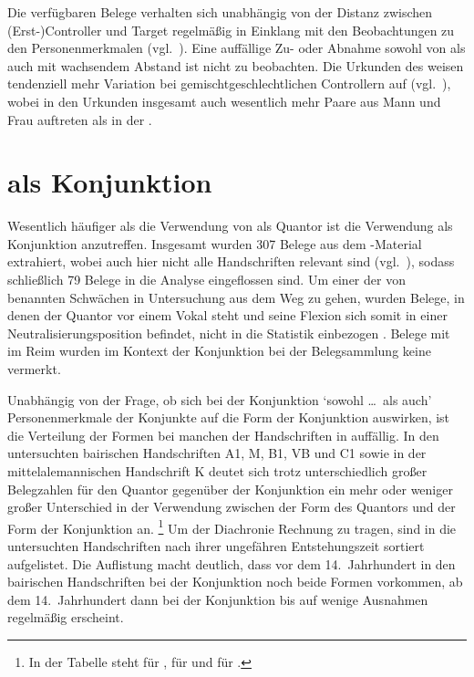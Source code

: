 Die verfügbaren Belege verhalten sich unabhängig von der Distanz zwischen
(Erst-)Controller und Target regelmäßig in Einklang mit den Beobachtungen zu den
Personenmerkmalen (vgl.~). Eine auffällige Zu-
oder Abnahme sowohl von  als auch  mit wachsendem
Abstand ist nicht zu beobachten. Die Urkunden des \CAO{}
weisen tendenziell mehr Variation bei gemischtgeschlechtlichen Controllern auf
(vgl.\ ), wobei in den Urkunden insgesamt auch wesentlich
mehr Paare aus Mann und Frau auftreten als in der \KC{}.


\section{ als Konjunktion}
\label{sec:kckonjunktion}

Wesentlich häufiger als die Verwendung von  als Quantor ist die
Verwendung als Konjunktion anzutreffen. Insgesamt wurden 307 Belege aus dem
\KC{}-Material extrahiert, wobei auch hier nicht alle Handschriften
relevant sind (vgl.\ ), sodass schließlich 79 Belege in
die Analyse eingeflossen sind. Um einer der von \citet{gjelsten1980} benannten
Schwächen in  Untersuchung aus dem Weg zu gehen, wurden
Belege, in denen der Quantor vor einem Vokal steht und seine Flexion sich somit
in einer Neutralisierungsposition befindet, nicht in die Statistik einbezogen
\autocite[vgl.][191--193, 201]{gjelsten1980}. Belege mit
 im Reim \autocites[vgl.][662--663]{grimm1870}[89]{askedal1973}
wurden im Kontext der Konjunktion bei der Belegsammlung keine vermerkt.

Unabhängig von der Frage, ob sich bei der Konjunktion 
`sowohl \dots\ als auch' Personenmerkmale der Konjunkte auf die Form der
Konjunktion auswirken, ist die Verteilung der Formen bei manchen der
Handschriften in  auffällig. In den untersuchten
bairischen Handschriften A1, M, B1, VB und C1 sowie in
der mittelalemannischen Handschrift K deutet sich
trotz unterschiedlich großer Belegzahlen für den Quantor gegenüber der
Konjunktion ein mehr oder weniger großer Unterschied in der Verwendung zwischen
der Form des Quantors und der Form der Konjunktion an.%
%
	\footnote{In der Tabelle steht \q{--} für ,
	\q{(\chk)} für  und \q{\chk} für .}
%
Um der Diachronie Rechnung zu tragen, sind in  die
untersuchten Handschriften nach ihrer ungefähren Entstehungszeit sortiert
aufgelistet. Die Auflistung macht deutlich, dass vor dem 14.~Jahrhundert in den
bairischen Handschriften bei der Konjunktion noch
beide Formen vorkommen, ab dem 14.~Jahrhundert dann bei der Konjunktion bis auf
wenige Ausnahmen regelmäßig  erscheint.

